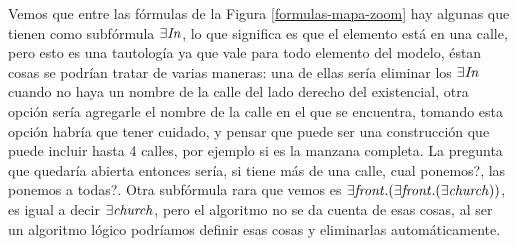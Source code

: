 Vemos que entre las f\'ormulas de la Figura \ref{formulas-mapa-zoom} hay algunas que tienen como subf\'ormula $\exists \mathit{In}$, lo que significa es que 
el elemento est\'a en una calle, pero esto es una tautolog\'ia ya que vale para todo elemento del modelo, \'estan cosas se podr\'ian tratar de varias maneras: una de ellas ser\'ia eliminar los $\exists \mathit{In}$ cuando no haya un nombre de la calle del lado derecho del existencial, 
otra opci\'on ser\'ia agregarle el nombre de la calle en el que se encuentra, tomando esta opci\'on habr\'ia que tener cuidado, 
y pensar que puede ser una construcci\'on que puede incluir hasta 4 calles, por ejemplo si es la manzana completa. La pregunta que quedar\'ia abierta
entonces ser\'ia, si tiene m\'as de una calle, cual ponemos?, las ponemos a todas?.
Otra subf\'ormula rara que vemos es $\exists \mathit{front} .(\exists \mathit{front} .(\exists \mathit{church}))$, es igual a decir $\exists \mathit{church}$, pero el algoritmo no se da cuenta de esas cosas, al ser un algoritmo l\'ogico podr\'iamos definir esas cosas y eliminarlas autom\'aticamente.

